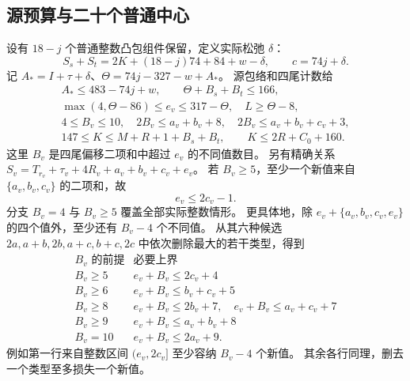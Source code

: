 \documentclass[11pt,a4paper]{article}
\begin{document}
\subsection{源预算与二十个普通中心}
设有 $18-j$ 个普通整数凸包组件保留，定义实际松弛 $\delta$：
\[
 S_s+S_t=2K+(18-j)74+84+w-\delta,\qquad c=74j+\delta.
\]
记 $A_*=I+\tau+\delta$、$\Theta=74j-327-w+A_*$。
源包络和四尾计数给
\begin{gather}
 A_*\le483-74j+w,\qquad \Theta+B_s+B_t\le166,\label{eq:budget}\\
 \max(4,\Theta-86)\le e_v\le317-\Theta,\quad L\ge\Theta-8,\nonumber\\
 4\le B_v\le10,\quad2B_v\le a_v+b_v+8,\quad
 2B_v\le a_v+b_v+c_v+3,\nonumber\\
 147\le K\le M+R+1+B_s+B_t,\qquad K\le2R+C_0+160.\nonumber
\end{gather}
这里 $B_v$ 是四尾偏移二项和中超过 $e_v$ 的不同值数目。
另有精确关系
$S_v=T_{r_v}+\tau_v+4R_v+a_v+b_v+c_v+e_v$。
若 $B_v\ge5$，至少一个新值来自 $\{a_v,b_v,c_v\}$ 的二项和，故
\begin{equation} e_v\le2c_v-1.\label{eq:B5}\end{equation}
分支 $B_v=4$ 与 $B_v\ge5$ 覆盖全部实际整数情形。
更具体地，除 $e_v+\{a_v,b_v,c_v,e_v\}$ 的四个值外，至少还有 $B_v-4$ 个不同值。
从其六种候选 $2a,a+b,2b,a+c,b+c,2c$ 中依次删除最大的若干类型，得到
\[
\begin{array}{c|l}
 B_v\text{ 的前提}&\text{必要上界}\\\hline
 B_v\ge5&e_v+B_v\le2c_v+4\\
 B_v\ge6&e_v+B_v\le b_v+c_v+5\\
 B_v\ge8&e_v+B_v\le2b_v+7,\quad e_v+B_v\le a_v+c_v+7\\
 B_v\ge9&e_v+B_v\le a_v+b_v+8\\
 B_v=10&e_v+B_v\le2a_v+9.
\end{array}
\]
例如第一行来自整数区间 $(e_v,2c_v]$ 至少容纳 $B_v-4$ 个新值。
其余各行同理，删去一个类型至多损失一个新值。
\end{document}
